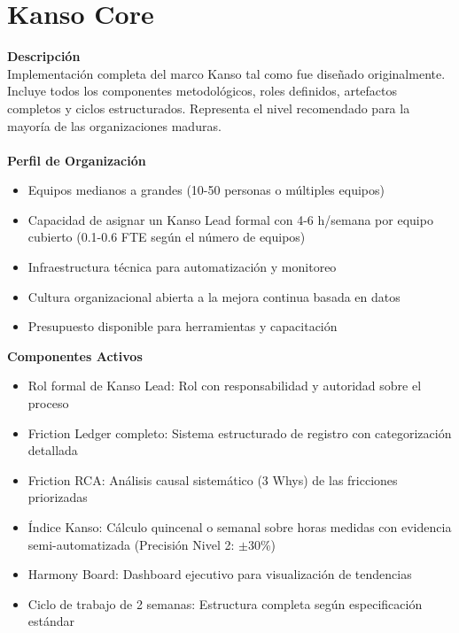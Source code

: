\section{Kanso Core}

\textbf{Descripción}\\
Implementación completa del marco Kanso tal como fue diseñado originalmente. Incluye todos los componentes metodológicos, roles definidos, artefactos completos y ciclos estructurados. Representa el nivel recomendado para la mayoría de las organizaciones maduras.
\\
\\
\textbf{Perfil de Organización}
\begin{itemize}
    \item Equipos medianos a grandes (10-50 personas o múltiples equipos)
    \item Capacidad de asignar un Kanso Lead formal con 4-6 h/semana por equipo cubierto (0.1-0.6 FTE según el número de equipos)
    \item Infraestructura técnica para automatización y monitoreo
    \item Cultura organizacional abierta a la mejora continua basada en datos
    \item Presupuesto disponible para herramientas y capacitación
\end{itemize}

\textbf{Componentes Activos}
\begin{itemize}
    \item Rol formal de Kanso Lead: Rol con responsabilidad y autoridad sobre el proceso
    \item Friction Ledger completo: Sistema estructurado de registro con categorización detallada
    \item Friction RCA: Análisis causal sistemático (3 Whys) de las fricciones priorizadas
    \item Índice Kanso: Cálculo quincenal o semanal sobre horas medidas con evidencia semi-automatizada (Precisión Nivel 2: $\pm$30\%)
    \item Harmony Board: Dashboard ejecutivo para visualización de tendencias
    \item Ciclo de trabajo de 2 semanas: Estructura completa según especificación estándar
\end{itemize}

